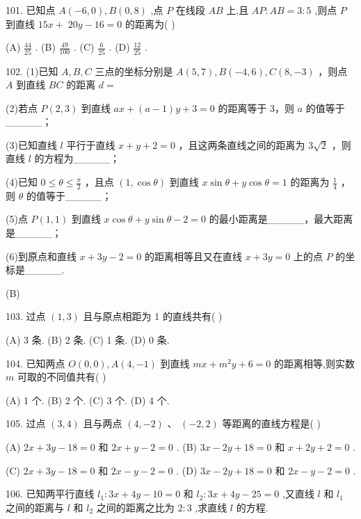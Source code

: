 \documentclass[10pt]{article}
\begin{document}
101. 已知点 \(A\left( {-6,0}\right) ,B\left( {0,8}\right)\) ,点 \(P\) 在线段 \({AB}\) 上,且 \({AP} : {AB} = 3 : 5\) ,则点 \(P\) 到直线 \({15x} + \; {20y} - {16} = 0\) 的距离为( )

(A) \(\frac{44}{25}\) . (B) \(\frac{49}{100}\) . (C) \(\frac{6}{25}\) . (D) \(\frac{12}{25}\) .

102. (1)已知 \(A,B,C\) 三点的坐标分别是 \(A\left( {5,7}\right) ,B\left( {-4,6}\right) ,C\left( {8, - 3}\right)\) ，则点 \(A\) 到直线 \({BC}\) 的距离 \(d =\)

(2)若点 \(P\left( {2,3}\right)\) 到直线 \({ax} + \left( {a - 1}\right) y + 3 = 0\) 的距离等于 3，则 \(a\) 的值等于\_\_\_\_\_；

(3)已知直线 \(l\) 平行于直线 \(x + y + 2 = 0\) ，且这两条直线之间的距离为 \(3\sqrt{2}\) ，则直线 \(l\) 的方程为\_\_\_\_\_；

(4)已知 \(0 \leq  \theta  \leq  \frac{\pi }{2}\) ，且点 \(\left( {1,\cos \theta }\right)\) 到直线 \(x\sin \theta  + y\cos \theta  = 1\) 的距离为 \(\frac{1}{4}\) ，则 \(\theta\) 的值等于\_\_\_\_\_；

(5)点 \(P\left( {1,1}\right)\) 到直线 \(x\cos \theta  + y\sin \theta  - 2 = 0\) 的最小距离是\_\_\_\_\_，最大距离是\_\_\_\_\_；

(6)到原点和直线 \(x + {3y} - 2 = 0\) 的距离相等且又在直线 \(x + {3y} = 0\) 上的点 \(P\) 的坐标是\_\_\_\_\_.

(B)

103. 过点 \(\left( {1,3}\right)\) 且与原点相距为 1 的直线共有( )

(A) 3 条. (B) 2 条. (C) 1 条. (D) 0 条.

104. 已知两点 \(O\left( {0,0}\right) ,A\left( {4, - 1}\right)\) 到直线 \({mx} + {m}^{2}y + 6 = 0\) 的距离相等,则实数 \(m\) 可取的不同值共有( )

(A) 1 个. (B) 2 个. (C) 3 个. (D) 4 个.

105. 过点 \(\left( {3,4}\right)\) 且与两点 \(\left( {4, - 2}\right) \text{ 、 }\left( {-2,2}\right)\) 等距离的直线方程是( )

(A) \({2x} + {3y} - {18} = 0\) 和 \({2x} + y - 2 = 0\) . (B) \({3x} - {2y} + {18} = 0\) 和 \(x + {2y} + 2 = 0\) .

(C) \({2x} + {3y} - {18} = 0\) 和 \({2x} - y - 2 = 0\) . (D) \({3x} - {2y} + {18} = 0\) 和 \({2x} - y - 2 = 0\) .

106. 已知两平行直线 \({l}_{1} : {3x} + {4y} - {10} = 0\) 和 \({l}_{2} : {3x} + {4y} - {25} = 0\) ,又直线 \(l\) 和 \({l}_{1}\) 之间的距离与 \(l\) 和 \({l}_{2}\) 之间的距离之比为 \(2 : 3\) ,求直线 \(l\) 的方程.
\end{document}

